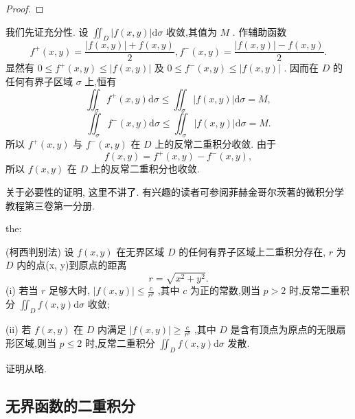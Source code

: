 \begin{proof}

\end{proof}
我们先证充分性. 设 \({\iint }_{D}\left| {f\left( {x,y}\right) }\right| \mathrm{d}\sigma\) 收敛,其值为 \(M\) . 作辅助函数
\[
{f}^{ + }\left( {x,y}\right)  = \frac{\left| {f\left( {x,y}\right) }\right|  + f\left( {x,y}\right) }{2},{f}^{ - }\left( {x,y}\right)  = \frac{\left| {f\left( {x,y}\right) }\right|  - f\left( {x,y}\right) }{2}.
\]
显然有 \(0 \leq  {f}^{ + }\left( {x,y}\right)  \leq  \left| {f\left( {x,y}\right) }\right|\) 及 \(0 \leq  {f}^{ - }\left( {x,y}\right)  \leq  \left| {f\left( {x,y}\right) }\right|\) . 因而在 \(D\) 的任何有界子区域 \(\sigma\) 上,恒有
\[
{\iint }_{\sigma }{f}^{ + }\left( {x,y}\right) \mathrm{d}\sigma  \leq  {\iint }_{\sigma }\left| {f\left( {x,y}\right) }\right| \mathrm{d}\sigma  = M,
\]
\[
{\iint }_{\sigma }{f}^{ - }\left( {x,y}\right) \mathrm{d}\sigma  \leq  {\iint }_{\sigma }\left| {f\left( {x,y}\right) }\right| \mathrm{d}\sigma  = M.
\]
所以 \({f}^{ + }\left( {x,y}\right)\) 与 \({f}^{ - }\left( {x,y}\right)\) 在 \(D\) 上的反常二重积分收敛. 由于
\[
f\left( {x,y}\right)  = {f}^{ + }\left( {x,y}\right)  - {f}^{ - }\left( {x,y}\right) ,
\]
所以 \(f\left( {x,y}\right)\) 在 \(D\) 上的反常二重积分也收敛.

关于必要性的证明, 这里不讲了. 有兴趣的读者可参阅菲赫金哥尔茨著的微积分学教程第三卷第一分册.

\begin{theorem}{}{the:}

\end{theorem}
 (柯西判别法) 设 \(f\left( {x,y}\right)\) 在无界区域 \(D\) 的任何有界子区域上二重积分存在, \(r\) 为 \(D\) 内的点(x, y)到原点的距离
\[
r = \sqrt{{x}^{2} + {y}^{2}}.
\]
(i) 若当 \(r\) 足够大时, \(\left| {f\left( {x,y}\right) }\right|  \leq  \frac{c}{{r}^{p}}\) ,其中 \(c\) 为正的常数,则当 \(p > 2\) 时,反常二重积分 \({\iint }_{D}f\left( {x,y}\right) \mathrm{d}\sigma\) 收敛;

(ii) 若 \(f\left( {x,y}\right)\) 在 \(D\) 内满足 \(\left| {f\left( {x,y}\right) }\right|  \geq  \frac{c}{{r}^{p}}\) ,其中 \(D\) 是含有顶点为原点的无限扇形区域,则当 \(p \leq  2\) 时,反常二重积分 \({\iint }_{D}f\left( {x,y}\right) \mathrm{d}\sigma\) 发散.

证明从略.

\subsection{无界函数的二重积分}

